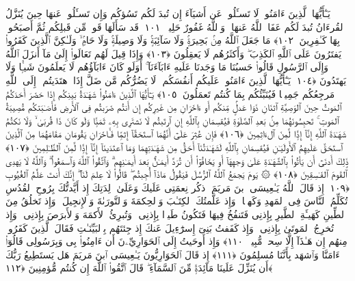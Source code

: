  يَـٰٓأَيُّهَا ٱلَّذِينَ ءَامَنُوا۟ لَا تَسـَٔلُوا۟ عَن أَشيَآءَ إِن تُبدَ لَكُم تَسُؤكُم وَإِن تَسـَٔلُوا۟ عَنهَا حِينَ يُنَزَّلُ ٱلقُرءَانُ تُبدَ لَكُم عَفَا ٱللَّهُ عَنهَا ۗ وَٱللَّهُ غَفُورٌ حَلِيمٌۭ ﴿١٠١﴾
 قَد سَأَلَهَا قَومٌۭ مِّن قَبلِكُم ثُمَّ أَصبَحُوا۟ بِهَا كَـٰفِرِينَ ﴿١٠٢﴾
 مَا جَعَلَ ٱللَّهُ مِنۢ بَحِيرَةٍۢ وَلَا سَآئِبَةٍۢ وَلَا وَصِيلَةٍۢ وَلَا حَامٍۢ ۙ وَلَـٰكِنَّ ٱلَّذِينَ كَفَرُوا۟ يَفتَرُونَ عَلَى ٱللَّهِ ٱلكَذِبَ ۖ وَأَكثَرُهُم لَا يَعقِلُونَ ﴿١٠٣﴾
 وَإِذَا قِيلَ لَهُم تَعَالَوا۟ إِلَىٰ مَآ أَنزَلَ ٱللَّهُ وَإِلَى ٱلرَّسُولِ قَالُوا۟ حَسبُنَا مَا وَجَدنَا عَلَيهِ ءَابَآءَنَآ ۚ أَوَلَو كَانَ ءَابَآؤُهُم لَا يَعلَمُونَ شَيـًۭٔا وَلَا يَهتَدُونَ ﴿١٠٤﴾
 يَـٰٓأَيُّهَا ٱلَّذِينَ ءَامَنُوا۟ عَلَيكُم أَنفُسَكُم ۖ لَا يَضُرُّكُم مَّن ضَلَّ إِذَا ٱهتَدَيتُم ۚ إِلَى ٱللَّهِ مَرجِعُكُم جَمِيعًۭا فَيُنَبِّئُكُم بِمَا كُنتُم تَعمَلُونَ ﴿١٠٥﴾
 يَـٰٓأَيُّهَا ٱلَّذِينَ ءَامَنُوا۟ شَهَـٰدَةُ بَينِكُم إِذَا حَضَرَ أَحَدَكُمُ ٱلمَوتُ حِينَ ٱلوَصِيَّةِ ٱثنَانِ ذَوَا عَدلٍۢ مِّنكُم أَو ءَاخَرَانِ مِن غَيرِكُم إِن أَنتُم ضَرَبتُم فِى ٱلأَرضِ فَأَصَـٰبَتكُم مُّصِيبَةُ ٱلمَوتِ ۚ تَحبِسُونَهُمَا مِنۢ بَعدِ ٱلصَّلَوٰةِ فَيُقسِمَانِ بِٱللَّهِ إِنِ ٱرتَبتُم لَا نَشتَرِى بِهِۦ ثَمَنًۭا وَلَو كَانَ ذَا قُربَىٰ ۙ وَلَا نَكتُمُ شَهَـٰدَةَ ٱللَّهِ إِنَّآ إِذًۭا لَّمِنَ ٱلءَاثِمِينَ ﴿١٠٦﴾
 فَإِن عُثِرَ عَلَىٰٓ أَنَّهُمَا ٱستَحَقَّآ إِثمًۭا فَـَٔاخَرَانِ يَقُومَانِ مَقَامَهُمَا مِنَ ٱلَّذِينَ ٱستَحَقَّ عَلَيهِمُ ٱلأَولَيَـٰنِ فَيُقسِمَانِ بِٱللَّهِ لَشَهَـٰدَتُنَآ أَحَقُّ مِن شَهَـٰدَتِهِمَا وَمَا ٱعتَدَينَآ إِنَّآ إِذًۭا لَّمِنَ ٱلظَّـٰلِمِينَ ﴿١٠٧﴾
 ذَٟلِكَ أَدنَىٰٓ أَن يَأتُوا۟ بِٱلشَّهَـٰدَةِ عَلَىٰ وَجهِهَآ أَو يَخَافُوٓا۟ أَن تُرَدَّ أَيمَـٰنٌۢ بَعدَ أَيمَـٰنِهِم ۗ وَٱتَّقُوا۟ ٱللَّهَ وَٱسمَعُوا۟ ۗ وَٱللَّهُ لَا يَهدِى ٱلقَومَ ٱلفَـٰسِقِينَ ﴿١٠٨﴾
 ۞ يَومَ يَجمَعُ ٱللَّهُ ٱلرُّسُلَ فَيَقُولُ مَاذَآ أُجِبتُم ۖ قَالُوا۟ لَا عِلمَ لَنَآ ۖ إِنَّكَ أَنتَ عَلَّٰمُ ٱلغُيُوبِ ﴿١٠٩﴾
 إِذ قَالَ ٱللَّهُ يَـٰعِيسَى ٱبنَ مَريَمَ ٱذكُر نِعمَتِى عَلَيكَ وَعَلَىٰ وَٟلِدَتِكَ إِذ أَيَّدتُّكَ بِرُوحِ ٱلقُدُسِ تُكَلِّمُ ٱلنَّاسَ فِى ٱلمَهدِ وَكَهلًۭا ۖ وَإِذ عَلَّمتُكَ ٱلكِتَـٰبَ وَٱلحِكمَةَ وَٱلتَّورَىٰةَ وَٱلإِنجِيلَ ۖ وَإِذ تَخلُقُ مِنَ ٱلطِّينِ كَهَيـَٔةِ ٱلطَّيرِ بِإِذنِى فَتَنفُخُ فِيهَا فَتَكُونُ طَيرًۢا بِإِذنِى ۖ وَتُبرِئُ ٱلأَكمَهَ وَٱلأَبرَصَ بِإِذنِى ۖ وَإِذ تُخرِجُ ٱلمَوتَىٰ بِإِذنِى ۖ وَإِذ كَفَفتُ بَنِىٓ إِسرَٰٓءِيلَ عَنكَ إِذ جِئتَهُم بِٱلبَيِّنَـٰتِ فَقَالَ ٱلَّذِينَ كَفَرُوا۟ مِنهُم إِن هَـٰذَآ إِلَّا سِحرٌۭ مُّبِينٌۭ ﴿١١٠﴾
 وَإِذ أَوحَيتُ إِلَى ٱلحَوَارِيِّۦنَ أَن ءَامِنُوا۟ بِى وَبِرَسُولِى قَالُوٓا۟ ءَامَنَّا وَٱشهَد بِأَنَّنَا مُسلِمُونَ ﴿١١١﴾
 إِذ قَالَ ٱلحَوَارِيُّونَ يَـٰعِيسَى ٱبنَ مَريَمَ هَل يَستَطِيعُ رَبُّكَ أَن يُنَزِّلَ عَلَينَا مَآئِدَةًۭ مِّنَ ٱلسَّمَآءِ ۖ قَالَ ٱتَّقُوا۟ ٱللَّهَ إِن كُنتُم مُّؤمِنِينَ ﴿١١٢﴾
